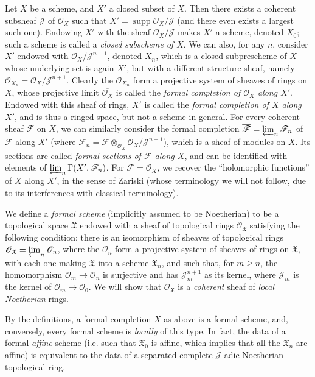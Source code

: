 \documentclass{article}
\theoremstyle{plain}
\theoremstyle{definition}
\newcommand{\sh}[1]{{\mathscr{#1}}}
\newcommand{\fk}{\mathfrak}
\renewcommand{\geq}{\geqslant}
\DeclareMathOperator{\supp}{supp}
\newcommand{\oldpage}[1]{\marginpar{\footnotesize$\Big\vert$ \textit{p.~#1}}}
\begin{document}
Let $X$ be a scheme, and $X'$ a closed subset of $X$.
Then there exists a coherent subsheaf $\sh{J}$ of $\sh{O}_X$ such that $X'=\supp\sh{O}_X/\sh{J}$ (and there even exists a largest such one).
Endowing $X'$ with the sheaf $\sh{O}_X/\sh{J}$ makes $X'$ a scheme, denoted $X_0$;
such a scheme is called a \emph{closed subscheme of $X$}.
We can also, for any $n$, consider $X'$ endowed with $\sh{O}_X/\sh{J}^{n+1}$, denoted $X_n$, which is a closed subprescheme of $X$ whose underlying set is again $X'$, but with a different structure sheaf, namely $\sh{O}_{X_n}=\sh{O}_X/\sh{J}^{n+1}$.
Clearly the $\sh{O}_{X_n}$ form a projective system of sheaves of rings on $X$, whose projective limit $\overline{\sh{O}_X}$ is called the \emph{formal completion of $\sh{O}_X$ along $X'$}.
Endowed with this sheaf of rings, $X'$ is called the \emph{formal completion of $X$ along $X'$}, and is thus a ringed space, but not a scheme in general.
For every coherent sheaf $\sh{F}$ on $X$, we can similarly consider the formal completion $\overline{\sh{F}}=\varprojlim_n\sh{F}_n$ of $\sh{F}$ along $X'$ (where $\sh{F}_n=\sh{F}\otimes_{\sh{O}_X}\sh{O}_X/\sh{J}^{n+1}$), which is a sheaf of modules on $\overline{X}$.
Its sections are called \emph{formal sections of $\sh{F}$ along $X$}, and can be identified with elements of $\varprojlim_n\Gamma(X',\sh{F}_n)$.
For $\sh{F}=\sh{O}_X$, we recover the ``holomorphic functions'' of $X$ along $X'$, in the sense of Zariski (whose terminology we will not follow, due to its interferences with classical terminology).

We define a \emph{formal scheme} (implicitly assumed to be Noetherian) to be a topological space $\fk{X}$ endowed with a sheaf of topological rings $\sh{O}_{\fk{X}}$ satisfying the following condition:
there is an isomorphism of sheaves of topological rings $\sh{O}_{\fk{X}}=\varprojlim_n\sh{O}_n$, where the $\sh{O}_n$ form a projective system of sheaves of rings on $\fk{X}$, with each one making $\fk{X}$ into a scheme $\fk{X}_n$, and such that, for $m\geq n$, the homomorphism $\sh{O}_m\to\sh{O}_n$ is surjective and has $\sh{J}_m^{n+1}$ as its kernel, where $\sh{J}_m$ is
\oldpage{182-04}
the kernel of $\sh{O}_m\to\sh{O}_0$.
We will show that $\sh{O}_{\fk{X}}$ is a \emph{coherent} sheaf of \emph{local Noetherian} rings.

By the definitions, a formal completion $\overline{X}$ as above is a formal scheme, and, conversely, every formal scheme is \emph{locally} of this type.
In fact, the data of a formal \emph{affine} scheme (i.e. such that $\fk{X}_0$ is affine, which implies that all the $\fk{X}_n$ are affine) is equivalent to the data of a separated complete $\sh{J}$-adic Noetherian topological ring.
\end{document}
